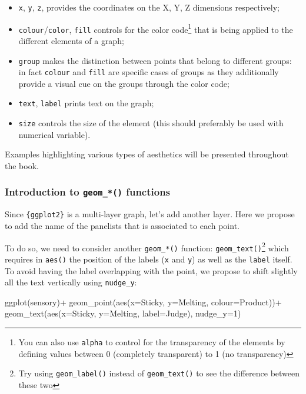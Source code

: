 \documentclass[
]{book}
\newenvironment{Shaded}{\begin{snugshade}}{\end{snugshade}}
\newcommand{\AttributeTok}[1]{\textcolor[rgb]{0.77,0.63,0.00}{#1}}
\newcommand{\DecValTok}[1]{\textcolor[rgb]{0.00,0.00,0.81}{#1}}
\newcommand{\FunctionTok}[1]{\textcolor[rgb]{0.00,0.00,0.00}{#1}}
\newcommand{\NormalTok}[1]{#1}
\newcommand{\SpecialCharTok}[1]{\textcolor[rgb]{0.00,0.00,0.00}{#1}}
\providecommand{\tightlist}{%
  \setlength{\itemsep}{0pt}\setlength{\parskip}{0pt}}
\begin{document}
\begin{itemize}
\tightlist
\item
  \texttt{x}, \texttt{y}, \texttt{z}, provides the coordinates on the X, Y, Z dimensions respectively;
\item
  \texttt{colour}/\texttt{color}, \texttt{fill} controls for the color code\footnote{You can also use \texttt{alpha} to control for the transparency of the elements by defining values between 0 (completely transparent) to 1 (no transparency)} that is being applied to the different elements of a graph;
\item
  \texttt{group} makes the distinction between points that belong to different groups: in fact \texttt{colour} and \texttt{fill} are specific cases of groups as they additionally provide a visual cue on the groups through the color code;
\item
  \texttt{text}, \texttt{label} prints text on the graph;
\item
  \texttt{size} controls the size of the element (this should preferably be used with numerical variable).
\end{itemize}

Examples highlighting various types of aesthetics will be presented throughout the book.

\hypertarget{introduction-to-geom_-functions}{%
\subsubsection{\texorpdfstring{Introduction to \texttt{geom\_*()} functions}{Introduction to geom\_*() functions}}\label{introduction-to-geom_-functions}}

Since \texttt{\{ggplot2\}} is a multi-layer graph, let's add another layer. Here we propose to add the name of the panelists that is associated to each point.

To do so, we need to consider another \texttt{geom\_*()} function: \texttt{geom\_text()}\footnote{Try using \texttt{geom\_label()} instead of \texttt{geom\_text()} to see the difference between these two} which requires in \texttt{aes()} the position of the labels (\texttt{x} and \texttt{y}) as well as the \texttt{label} itself.
To avoid having the label overlapping with the point, we propose to shift slightly all the text vertically using \texttt{nudge\_y}:

\begin{Shaded}
\begin{Highlighting}[]
\FunctionTok{ggplot}\NormalTok{(sensory)}\SpecialCharTok{+}
  \FunctionTok{geom\_point}\NormalTok{(}\FunctionTok{aes}\NormalTok{(}\AttributeTok{x=}\NormalTok{Sticky, }\AttributeTok{y=}\NormalTok{Melting, }\AttributeTok{colour=}\NormalTok{Product))}\SpecialCharTok{+}
  \FunctionTok{geom\_text}\NormalTok{(}\FunctionTok{aes}\NormalTok{(}\AttributeTok{x=}\NormalTok{Sticky, }\AttributeTok{y=}\NormalTok{Melting, }\AttributeTok{label=}\NormalTok{Judge), }\AttributeTok{nudge\_y=}\DecValTok{1}\NormalTok{)}
\end{Highlighting}
\end{Shaded}
\end{document}

